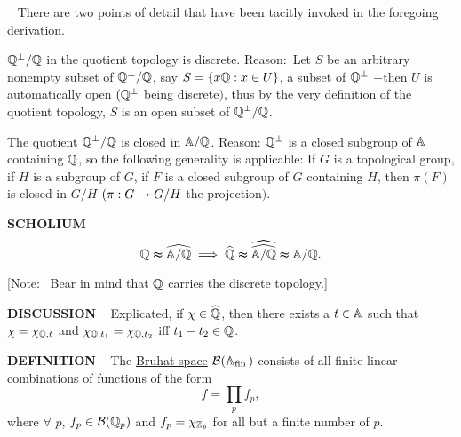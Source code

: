 \vspace{0.1cm}


\begin{x}{\small\bf {}} \ %
There are two points of detail that have been tacitly invoked in the foregoing derivation.


\qquad \textbullet \quad $\mathbb{Q}^\perp/\mathbb{Q}$ in the quotient topology is discrete.  
Reason$:$  Let $S$ be an arbitrary nonempty subset of $\mathbb{Q}^\perp/\mathbb{Q}$, say 
$S = \{x\mathbb{Q}: x \in U\}$, \mU a subset of $\mathbb{Q}^\perp$ $-$then $U$ is automatically open $(\mathbb{Q}^\perp$ being discrete$)$, 
thus by the very definition of the quotient 
topology, $S$ is an open subset of $\mathbb{Q}^\perp/\mathbb{Q}$.

\qquad \textbullet \quad The quotient $\mathbb{Q}^\perp/\mathbb{Q}$ is closed in $\mathbb{A}/\mathbb{Q}$.  
Reason: $\mathbb{Q}^\perp$ is a closed subgroup of $\mathbb{A}$ containing $\mathbb{Q}$, so the following generality is applicable:  
If $G$ is a topological group, if $H$ is a subgroup of $G$, if $F$ is a closed subgroup of $G$ containing $H$, 
then $\pi(F)$ is closed in $G/H$ $(\pi : G \rightarrow G/H$ the projection$)$.
\end{x}

\vspace{0.1cm}


\begin{x}{\small\bf SCHOLIUM} \ %
\[
\mathbb{Q} \thickapprox \widehat{\mathbb{A}/\mathbb{Q}} \implies \widehat{\mathbb{Q}} \thickapprox \widehat{\widehat{\mathbb{A}/\mathbb{Q}}} \thickapprox \mathbb{A}/\mathbb{Q}.
\]

\vspace{0.1cm}

[Note: \  Bear in mind that $\mathbb{Q}$ carries the discrete topology.]
\end{x}

\vspace{0.1cm}

\begin{x}{\small\bf DISCUSSION} \ %
Explicated, if $\chi \in \widehat{\mathbb{Q}}$, then there exists a $t \in \mathbb{A}$ such that $\chi = \chi_{\mathbb{Q}, t}$ and $\chi_{\mathbb{Q}, t_1} = \chi_{\mathbb{Q}, t_2}$ iff $ t_1 - t_2 \in \mathbb{Q}$.
\end{x}

\vspace{0.1cm}

\begin{x}{\small\bf DEFINITION} \ %
The 
\underline{Bruhat space}
$\sB(\A_{\fin})$
\index{$\sB(\A_{\fin})$} 
consists of all finite linear combinations of functions of the form
\[
f = \prod_p f_{p},
\]
where $\forall$ $p$, $f_p \in \mathcal{B}(\mathbb{Q}_p)$ and $f_p = \chi_{\mathbb{Z}_p}$ for all but a finite number of $p$.
\end{x}

